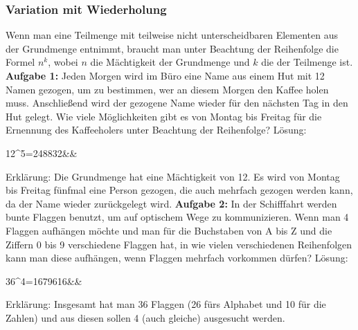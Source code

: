 \documentclass[12pt]{article}
\begin{document}
			\subsubsection{Variation mit Wiederholung}
				Wenn man eine Teilmenge mit teilweise nicht unterscheidbaren Elementen aus der Grundmenge entnimmt, braucht man unter Beachtung der Reihenfolge die Formel $n^k$, wobei $n$ die Mächtigkeit der Grundmenge und $k$ die der Teilmenge ist.\newline\newline
				\textbf{Aufgabe 1:} Jeden Morgen wird im Büro eine Name aus einem Hut mit 12 Namen gezogen, um zu bestimmen, wer an diesem Morgen den Kaffee holen muss. Anschließend wird der gezogene Name wieder für den nächsten Tag in den Hut gelegt. Wie viele Möglichkeiten gibt es von Montag bis Freitag für die Ernennung des Kaffeeholers unter Beachtung der Reihenfolge?\newline\newline
				Lösung:
				\begin{flalign*}
					12^5=248832&&
				\end{flalign*}
				Erklärung: Die Grundmenge hat eine Mächtigkeit von 12. Es wird von Montag bis Freitag fünfmal eine Person gezogen, die auch mehrfach gezogen werden kann, da der Name wieder zurückgelegt wird.\newline\newline
				\textbf{Aufgabe 2:} In der Schifffahrt werden bunte Flaggen benutzt, um auf optischem Wege zu kommunizieren. Wenn man 4 Flaggen aufhängen möchte und man für die Buchstaben von A bis Z und die Ziffern 0 bis 9 verschiedene Flaggen hat, in wie vielen verschiedenen Reihenfolgen kann man diese aufhängen, wenn Flaggen mehrfach vorkommen dürfen?\newline\newline
				Lösung:
				\begin{flalign*}
					36^4=1679616&&
				\end{flalign*}
				Erklärung: Insgesamt hat man 36 Flaggen (26 fürs Alphabet und 10 für die Zahlen) und aus diesen sollen 4 (auch gleiche) ausgesucht werden.
\end{document}
